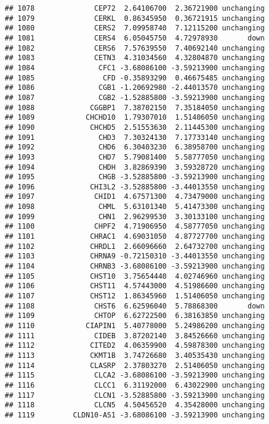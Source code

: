 \documentclass[]{article}
\begin{document}
\begin{verbatim}
## 1078              CEP72  2.64106700  2.36721900 unchanging
## 1079              CERKL  0.86345950  0.36721915 unchanging
## 1080              CERS2  7.09958740  7.12115200 unchanging
## 1081              CERS4  6.05045750  4.72978930       down
## 1082              CERS6  7.57639550  7.40692140 unchanging
## 1083              CETN3  4.31034560  4.32804870 unchanging
## 1084               CFC1 -3.68086100 -3.59213900 unchanging
## 1085                CFD -0.35893290  0.46675485 unchanging
## 1086               CGB1 -1.20692980 -2.44013570 unchanging
## 1087               CGB2 -1.52885800 -3.59213900 unchanging
## 1088             CGGBP1  7.38702150  7.35184050 unchanging
## 1089            CHCHD10  1.79307010  1.51406050 unchanging
## 1090             CHCHD5  2.51553630  2.11445300 unchanging
## 1091               CHD3  7.30324130  7.17733140 unchanging
## 1092               CHD6  6.30403230  6.38958700 unchanging
## 1093               CHD7  5.79081400  5.58777050 unchanging
## 1094               CHDH  3.82869390  3.59328720 unchanging
## 1095               CHGB -3.52885800 -3.59213900 unchanging
## 1096             CHI3L2 -3.52885800 -3.44013550 unchanging
## 1097              CHID1  4.67571300  4.73479000 unchanging
## 1098               CHML  5.63101340  5.41473300 unchanging
## 1099               CHN1  2.96299530  3.30133100 unchanging
## 1100              CHPF2  4.71906950  4.58777050 unchanging
## 1101             CHRAC1  4.69031050  4.87727700 unchanging
## 1102             CHRDL1  2.66096660  2.64732700 unchanging
## 1103             CHRNA9 -0.72150310 -3.44013550 unchanging
## 1104             CHRNB3 -3.68086100 -3.59213900 unchanging
## 1105             CHST10  3.75654440  4.02746960 unchanging
## 1106             CHST11  4.57443000  4.51986600 unchanging
## 1107             CHST12  1.86345960  1.51406050 unchanging
## 1108              CHST6  6.62596040  5.78868300       down
## 1109              CHTOP  6.62722500  6.38163850 unchanging
## 1110            CIAPIN1  5.40778000  5.24986200 unchanging
## 1111              CIDEB  3.87202140  3.84526660 unchanging
## 1112             CITED2  4.06359900  4.59878300 unchanging
## 1113             CKMT1B  3.74726680  3.40535430 unchanging
## 1114             CLASRP  2.37803270  2.51406050 unchanging
## 1115              CLCA2 -3.68086100 -3.59213900 unchanging
## 1116              CLCC1  6.31192000  6.43022900 unchanging
## 1117              CLCN1 -3.52885800 -3.59213900 unchanging
## 1118              CLCN5  4.50456520  4.35428000 unchanging
## 1119         CLDN10-AS1 -3.68086100 -3.59213900 unchanging

\end{verbatim}
\end{document}
